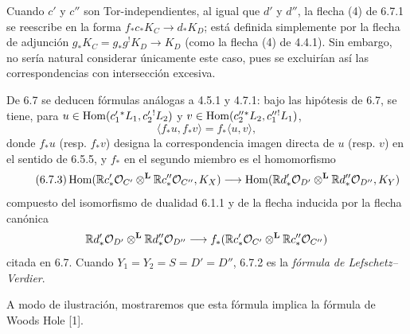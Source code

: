 Cuando $c'$ y $c''$ son Tor-independientes, al igual que $d'$ y $d''$, la flecha (4) de 6.7.1 se reescribe en la forma $f_*c_*K_C\to d_*K_D$; está definida simplemente por la flecha de adjunción $g_*K_C=g_*g^!K_D\to K_D$ (como la flecha (4) de 4.4.1). Sin embargo, no sería natural considerar únicamente este caso, pues se excluirían así las correspondencias con intersección excesiva.

De 6.7 se deducen fórmulas análogas a 4.5.1 y 4.7.1: bajo las hipótesis de 6.7, se tiene, para $u\in\operatorname{Hom}(c_1'{}^*L_1,c_2'{}^!L_2)$ y $v\in\operatorname{Hom}(c_2''{}^*L_2,c_1''{}^!L_1)$,
\begin{equation}
\tag{6.7.2}
\langle f_*u,f_*v\rangle=f_*\langle u,v\rangle,
\end{equation}
donde $f_*u$ (resp. $f_*v$) designa la correspondencia imagen directa de $u$ (resp. $v$) en el sentido de 6.5.5, y $f_*$ en el segundo miembro es el homomorfismo
\begin{equation}
\tag{6.7.3}
\operatorname{Hom}(\mathbb{R} c'_*\mathcal{O}_{C'}\otimes^{\mathbf L}\mathbb{R} c''_*\mathcal{O}_{C''},K_X)
\longrightarrow
\operatorname{Hom}(\mathbb{R} d'_*\mathcal{O}_{D'}\otimes^{\mathbf L}\mathbb{R} d''_*\mathcal{O}_{D''},K_Y)
\end{equation}
compuesto del isomorfismo de dualidad 6.1.1 y de la flecha inducida por la flecha canónica
\[
\mathbb{R} d'_*\mathcal{O}_{D'}\otimes^{\mathbf L}\mathbb{R} d''_*\mathcal{O}_{D''}\longrightarrow f_*(\mathbb{R} c'_*\mathcal{O}_{C'}\otimes^{\mathbf L}\mathbb{R} c''_*\mathcal{O}_{C''})
\]
citada en 6.7. Cuando $Y_1=Y_2=S=D'=D''$, 6.7.2 es la \emph{fórmula de Lefschetz--Verdier}.

A modo de ilustración, mostraremos que esta fórmula implica la fórmula de Woods Hole [1].
